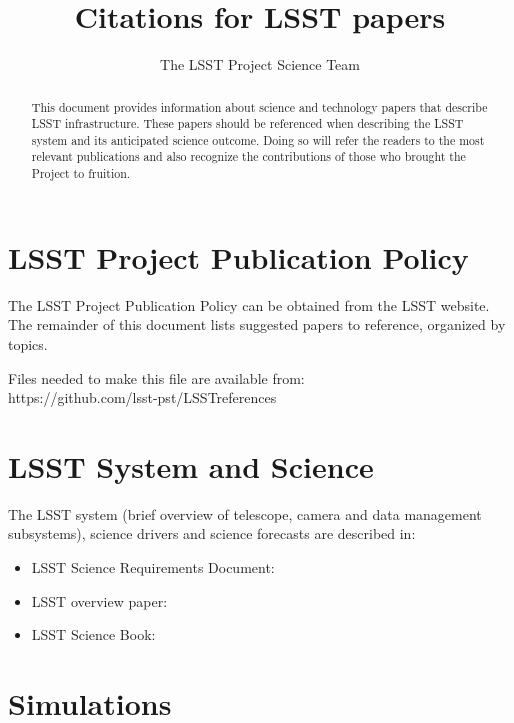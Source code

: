 \documentclass[12pt]{article}
\begin{document}
\title{Citations for LSST papers}
\author{The LSST Project Science Team}
\maketitle


\begin{abstract}
This document provides information about science and technology papers that describe LSST infrastructure.
These papers should be referenced when describing the LSST system and its anticipated science
outcome. Doing so will refer the readers to the most relevant publications and also recognize the 
contributions of those who brought the Project to fruition.
\end{abstract}


\tableofcontents

\newpage
\section{LSST Project Publication Policy} 

The LSST Project Publication Policy can be obtained from the LSST website.
The remainder of this document lists suggested papers to reference, organized by topics. 

Files needed to make this file are available from: \\
https://github.com/lsst-pst/LSSTreferences

\section{LSST System and Science}

The LSST system (brief overview of telescope, camera and data management subsystems),
science drivers and science forecasts are described in:

\begin{itemize}
\item LSST Science Requirements Document: \cite{lsstSRD}
\item LSST overview paper: \cite{ivezic2008lsst}
\item LSST Science Book: \cite{abell2009lsst}
\end{itemize}


\section{Simulations}
\end{document}
